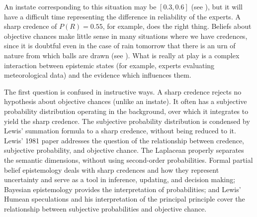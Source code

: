 \documentclass[11pt]{article}
\begin{document}
An instate corresponding to this situation may be $[0.3,0.6]$ (see
), but it will have a difficult time
representing the difference in reliability of the experts. A sharp
credence of $P(R)=0.55$, for example, does the right thing. Beliefs
about objective chances make little sense in many situations where we
have credences, since it is doubtful even in the case of rain tomorrow
that there is an urn of nature from which balls are drawn (see
). What is really at play is a complex
interaction between epistemic states (for example, experts evaluating
meteorological data) and the evidence which influences them.


The first question is confused in instructive ways. A sharp credence
rejects no hypothesis about objective chances (unlike an instate). It
often has a subjective probability distribution operating in the
background, over which it integrates to yield the sharp credence. The
subjective probability distribution is condensed by Lewis' summation
formula to a sharp credence, without being reduced to it. Lewis' 1981
paper  addresses the
question of the relationship between credence, subjective probability,
and objective chance. The Laplacean properly separates the semantic
dimensions, without using second-order probabilities. Formal partial
belief epistemology deals with sharp credences and how they represent
uncertainty and serve as a tool in inference, updating, and decision
making; Bayesian epistemology provides the interpretation of
probabilities; and Lewis' Humean speculations and his interpretation
of the principal principle cover the relationship between subjective
probabilities and objective chance.
\end{document}
